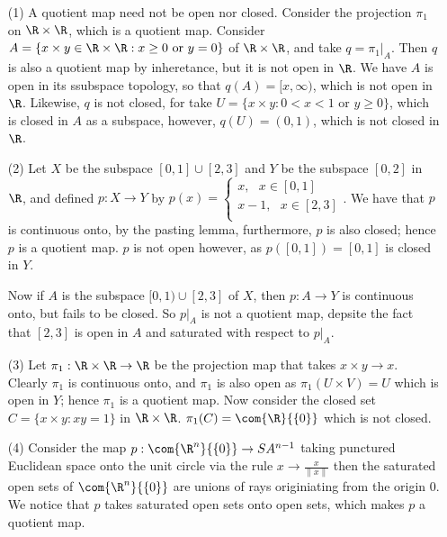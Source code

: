 \begin{example}
    \begin{enumerate}
        \item[(1)] A quotient map need not be open nor closed. Consider the
            projection $\pi_1$ on $\R \times \R$, which is a quotient map.
            Consider $A=\{x \times y \in \R \times \R : x \geq 0 \text{ or }
            y=0\}$ of $\R \times \R$, and take $q=\pi_1|_{A}$. Then $q$ is also
            a quotient map by inheretance, but it is not open in  $\R$. We have
             $A$ is open in its ssubspace topology, so that  $q(A)=[x, \infty)$,
             which is not open in $\R$. Likewise, $q$ is not closed, for take
             $U=\{x \times y: 0<x<1 \text{ or } y \geq 0\}$, which is closed in
             $A$ as a subspace, however,  $q(U)=(0,1)$, which is not closed in
             $\R$.

        \item[(2)] Let $X$ be the subspace  $[0,1] \cup [2,3]$ and $Y$ be the
            subspace  $[0,2]$ in $\R$, and defined  $p:X \rightarrow Y$ by
            $p(x)=\begin{cases}
                        x, \text{ } x \in [0,1] \\
                        x-1, \text{ } x \in [2,3] \\
                  \end{cases}$.
        We have that $p$ is continuous onto, by the pasting lemma, furthermore,
        $p$ is also closed; hence  $p$ is a quotient map.  $p$ is not open however,
        as  $p([0,1])=[0,1]$ is closed in $Y$.

        Now if  $A$ is the subspace  $[0,1) \cup [2,3]$ of $X$, then  $p:A
        \rightarrow Y$ is continuous onto, but fails to be closed. So  $p|_A$ is
        not a quotient map, depsite the fact that  $[2,3]$ is open in $A$ and
        saturated with respect to  $p|_A$.

        \item[(3)] Let $\pi_1:\R \times \R \rightarrow \R$ be the projection map
            that takes $x \times y \rightarrow x$. Clearly  $\pi_1$ is continuous
            onto, and $\pi_1$ is also open as $\pi_1(U \times V)=U$ which is open
            in $Y$; hence  $\pi_1$ is a quotient map. Now consider the closed
            set $C=\{x \times y:xy=1\}$ in $\R \times \R$.
            $\pi_1(C)=\com{\R}{\{0\}}$ which is not closed.

        \item[(4)] Consider the map $p:\com{\R^n}{\{0\}} \rightarrow SA^{n-1}$
            taking punctured Euclidean space onto the unit circle via the rule
            $x \rightarrow \frac{x}{\|x\|}$ then the saturated open sets of
            $\com{\R^n}{\{0\}}$ are unions of rays originiating from the origin
            $0$. We notice that $p$ takes saturated open sets onto open sets,
            which makes $p$ a quotient map.


\end{enumerate}
\end{example}
